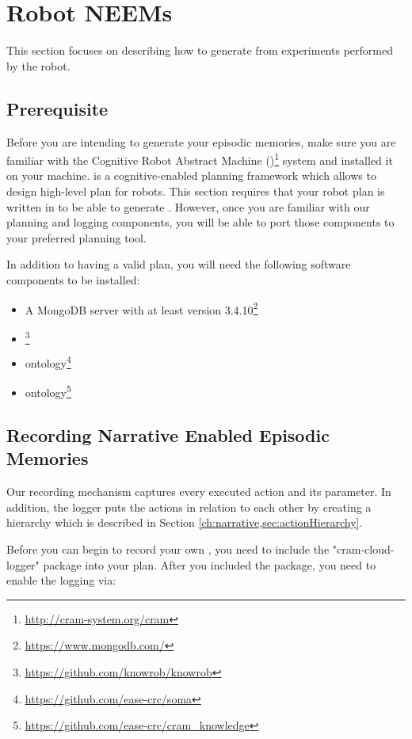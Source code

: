 \section{Robot NEEMs}
\label{sec:robot-neem}
\lstset{style=lispcode}
This section focuses on describing how to generate \neems from experiments performed by the robot. 

\subsection{Prerequisite}

Before you are intending to generate your episodic memories, make sure you are familiar with the Cognitive Robot Abstract Machine (\cram)\footnote{\url{http://cram-system.org/cram}} system and installed it on your machine.
\cram is a cognitive-enabled planning framework which allows to design high-level plan for robots.
This section requires that your robot plan is written in \cram to be able to generate \neems.
However, once you are familiar with our planning and logging components, you will be able to port those components to your preferred planning tool.

In addition to having a valid \cram plan, you will need the following software components to be installed:
\begin{itemize}
	\item A MongoDB server with at least version 3.4.10\footnote{\url{https://www.mongodb.com/}}
	\item \knowrob\footnote{\url{https://github.com/knowrob/knowrob}}
	\item \soma ontology\footnote{\url{https://github.com/ease-crc/soma}}
	\item \cram ontology\footnote{\url{https://github.com/ease-crc/cram\_knowledge}}
\end{itemize}


\subsection{Recording Narrative Enabled Episodic Memories}
Our recording mechanism  captures every executed \cram action and its parameter.
In addition, the logger puts the actions in relation to each other by creating a hierarchy which is described in Section \ref{ch:narrative,sec:actionHierarchy}.

Before you can begin to record your own \neems, you need to include the "cram-cloud-logger" package  into your \cram plan.
After you included the package, you need to enable the logging via:


